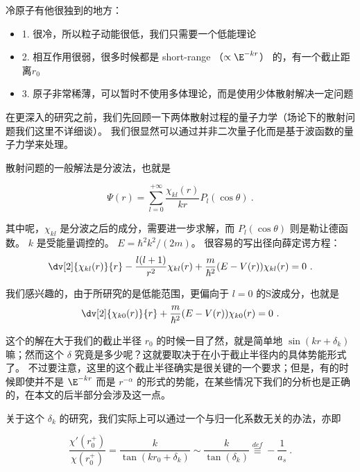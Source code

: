 
冷原子有他很独到的地方：
\begin{itemize}
\item 1. 很冷，所以粒子动能很低，我们只需要一个低能理论
\item 2. 相互作用很弱，很多时候都是 short-range （$\propto \E^{-kr}$） 的，有一个截止距离$r_0$
\item 3. 原子非常稀薄，可以暂时不使用多体理论，而是使用少体散射解决一定问题
\end{itemize}

在更深入的研究之前，我们先回顾一下两体散射过程的量子力学（场论下的散射问题我们这里不详细谈）。 我们很显然可以通过并非二次量子化而是基于波函数的量子力学来处理。

散射问题的一般解法是分波法，也就是

\begin{equation}
\Psi(r) = \sum_{l=0}^{+\infty}\frac{\chi_{kl}(r)}{kr}P_l(\cos\theta) ~.
\end{equation}

其中呢，$\chi_{kl}$ 是分波之后的成分，需要进一步求解，而 $P_l(\cos\theta)$ 则是勒让德函数。 $k$ 是受能量调控的。 $E=\hbar^2 k^2/(2m)$。 很容易的写出径向薛定谔方程：
\begin{equation}
\dv[2]{\chi_{kl}(r)}{r} - \frac{l(l+1)}{r^2}\chi_{kl}(r) + \frac{m}{\hbar^2}(E-V(r))\chi_{kl}(r) = 0~.
\end{equation}

我们感兴趣的，由于所研究的是低能范围，更偏向于 $l=0$ 的S波成分，也就是
\begin{equation}
\dv[2]{\chi_{k0}(r)}{r}+ \frac{m}{\hbar^2}(E-V(r))\chi_{k0}(r) = 0~.
\end{equation}

这个的解在大于我们的截止半径 $r_0$ 的时候一目了然，就是简单地 $\sin(kr + \delta_k)$ 嘛；然而这个 $\delta$ 究竟是多少呢？这就要取决于在小于截止半径内的具体势能形式了。 不过要注意，这里的这个截止半径确实是很关键的一个要求；但是，有的时候即使并不是 $\E^{-kr}$ 而是 $r^{-\alpha}$ 的形式的势能，在某些情况下我们的分析也是正确的，在本文的后半部分会涉及这一点。

关于这个 $\delta_k$ 的研究，我们实际上可以通过一个与归一化系数无关的办法，亦即

\begin{equation}
\frac{\chi'(r_0^+)}{\chi(r_0^+)} = \frac{k}{\tan(k r_0 +\delta_k)} \sim \frac{k}{\tan(\delta_k)} \overset{def}{\equiv} -\frac{1}{a_s} ~.
\end{equation}

